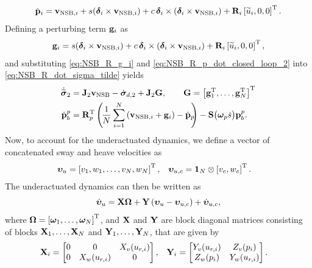 \begin{equation}
    \dot{\mathbf{p}}_i = \mathbf{v}_{{\rm NSB}, i} 
                + s(\bm{\delta}_i \times \mathbf{v}_{{\rm NSB}, i})
                + c\,\bm{\delta}_i\times(\bm{\delta}_i \times \mathbf{v}_{{\rm NSB}, i})
                + \mathbf{R}_{i}\left[\widetilde{u}_i, 0, 0\right]^{\mathrm{T}}.
    \label{eq:NSB_R_p_dot_closed_loop_2}
\end{equation}
Defining a perturbing term $\mathbf{g}_i$ as 
\begin{equation}
    \mathbf{g}_i = s(\bm{\delta}_i \times \mathbf{v}_{{\rm NSB}, i}) 
                + c\,\bm{\delta}_i\times(\bm{\delta}_i \times \mathbf{v}_{{\rm NSB}, i}) 
                + \mathbf{R}_{i}\left[\widetilde{u}_i, 0, 0\right]^{\mathrm{T}},
                \label{eq:NSB_R_g_i}
\end{equation}
and substituting \eqref{eq:NSB_R_g_i} and \eqref{eq:NSB_R_p_dot_closed_loop_2} into \eqref{eq:NSB_R_dot_sigma_tilde} yields 
\begin{subequations}
    \begin{align}
        \dot{\widetilde{\bs{\sigma}}}_2 &= \mat{J}_2\ivel_{\rm NSB} - \dot{\bs{\sigma}}_{d, 2}
                                        +\mat{J}_2\mat{G}, \qquad \mat{G} = \inlinevector{\mat{g}_1\T, \ldots, \mat{g}_N\T} \\
        \dot{\mat{p}}_b^p &= \mat{R}_p\T\left(\!\frac{1}{N}\sum_{i=1}^N\left(\ivel_{{\rm NSB}, i} + \mat{g}_i\right) - \dot{\mat{p}}_{\mathrlap{p}}\right) - \mat{S}\big(\bs{\omega}_p\dot{s}\big)\mat{p}_b^p \mathrlap{.}
    \end{align} \label{eq:NSB_R_outer_loop}
\end{subequations}
Now, to account for the underactuated dynamics, we define a vector of concatenated sway and heave velocities as 
\begin{align}
    \bm{\upsilon}_u &= \left[v_1, w_1, \ldots, v_N, w_N\right]^{\mathrm{T}}, &
    \bm{\upsilon}_{u, c} &= \mathbf{1}_N \otimes \left[v_c, w_c\right]^{\mathrm{T}}.
\end{align}
The underactuated dynamics can then be written as
\begin{equation}
    \dot{\bm{\upsilon}}_u = \mathbf{X}\bm{\Omega} + \mathbf{Y}\left(\bm{\upsilon}_u - \bm{\upsilon}_{u, c}\right) + \dot{\bm{\upsilon}}_{u, c}, \label{eq:NSB_R_underactuated_dynamics_closed_loop}
\end{equation}
where $\bm{\Omega} = \left[\bm{\omega}_1, \ldots, \bm{\omega}_N\right]^{\mathrm{T}}$, and $\mathbf{X}$ and $\mathbf{Y}$ are block diagonal matrices consisting of blocks $\mathbf{X}_1, \ldots, \mathbf{X}_N$ and $\mathbf{Y}_1, \ldots, \mathbf{Y}_N$, that are given by 
\begin{align}
    \mathbf{X}_i &= 
    \begin{bmatrix}
        0 & 0 & X_v(u_{r, i}) \\
        0 & X_w(u_{r, i}) & 0
    \end{bmatrix}, &
    \mathbf{Y}_i &=
    \begin{bmatrix}
        Y_v(u_{r,i}) & Z_v(p_i) \\
        Z_w(p_i) & Y_w(u_{r, i})
    \end{bmatrix}.
\end{align}


